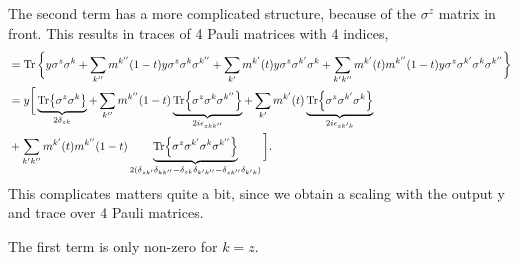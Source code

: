 The second term has a more complicated structure, because of the $\sigma^z$ matrix in front. This results in traces of 4 Pauli matrices with 4 indices,
\begin{align*}
    &= \Tr\bigg\{ y \sigma^z\sigma^k + 
    \sum_{k^{\prime\prime}} m^{k^{\prime\prime}}(1-t) y \sigma^z\sigma^k\sigma^{k^{\prime\prime}} +
    \sum_{k^{\prime}} m^{k^{\prime}}(t) y \sigma^z\sigma^{k^{\prime}} \sigma^k + 
    \sum_{k^{\prime}k^{\prime\prime}} m^{k^{\prime}}(t) m^{k^{\prime\prime}}(1-t)y \sigma^z\sigma^{k^{\prime}} \sigma^k\sigma^{k^{\prime\prime}}\bigg\}\\
    &= y\bigg[\underbrace{\Tr{\sigma^z\sigma^k}}_{2\delta_{zk}} + 
    \sum_{k^{\prime\prime}} m^{k^{\prime\prime}}(1-t)  \underbrace{\Tr{\sigma^z\sigma^k\sigma^{k^{\prime\prime}}}}_{2i\epsilon_{zk k^{\prime\prime}}} +
    \sum_{k^{\prime}} m^{k^{\prime}}(t) \underbrace{\Tr{ \sigma^z\sigma^{k^{\prime}} \sigma^k }}_{2i\epsilon_{z k^{\prime}k}}\\
    & + \sum_{k^{\prime}k^{\prime\prime}} m^{k^{\prime}}(t) m^{k^{\prime\prime}}(1-t) \underbrace{\Tr{\sigma^z\sigma^{k^{\prime}} \sigma^k\sigma^{k^{\prime\prime}}} }_{2(\delta_{zk^{\prime}}\delta_{kk^{\prime\prime}} - \delta_{zk}\delta_{k^{\prime}k^{\prime\prime}} - \delta_{zk^{\prime\prime}}\delta_{k^{\prime}k})}\bigg].
\end{align*}
This complicates matters quite a bit, since we obtain a scaling with the output y and trace over 4 Pauli matrices.\newline

\noindent The first term is only non-zero for $k=z$.\newline

